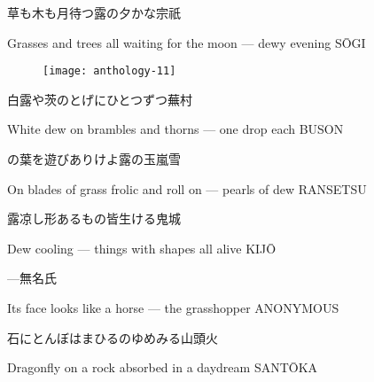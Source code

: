 \begin{haiku}
    {\FH 草も木も月待つ露の夕かな}\hfill{\FH 宗祇}

    \vin{} Grasses and trees all
    \vin{} \vin{} waiting for the moon ---
    \vin{} \vin{} \vin{} dewy evening \hspace{\fill} S\={O}GI
\end{haiku}

\begin{figure}
    \texttt{[image: anthology-11]}
\end{figure}

\begin{haiku}
    {\FH 白露や茨のとげにひとつずつ}\hfill{\FH 蕪村}

    \vin{} White dew
    \vin{} \vin{} on brambles and thorns ---
    \vin{} \vin{} \vin{} one drop each \hspace{\fill} BUSON
\end{haiku}

\begin{haiku}
    {\FH {}の葉を遊びありけよ露の玉}\hfill{\FH 嵐雪}

    \vin{} On blades of grass
    \vin{} \vin{} frolic and roll on ---
    \vin{} \vin{} \vin{} pearls of dew \hspace{\fill} RANSETSU
\end{haiku}

\begin{haiku}
    {\FH 露凉し形あるもの皆生ける}\hfill{\FH 鬼城}

    \vin{} Dew cooling ---
    \vin{} \vin{} things with shapes
    \vin{} \vin{} \vin{} all alive \hspace{\fill} KIJ\={O}
\end{haiku}

\begin{haiku}
    {---}\hfill{\FH 無名氏}

    \vin{} Its face
    \vin{} \vin{} looks like a horse ---
    \vin{} \vin{} \vin{} the grasshopper \hspace{\fill} ANONYMOUS
\end{haiku}

\begin{haiku}
    {\FH 石にとんぼはまひるのゆめみる}\hfill{\FH 山頭火}

    \vin{} Dragonfly on a rock
    \vin{} \vin{} absorbed in
    \vin{} \vin{} \vin{} a daydream \hspace{\fill} SANT\={O}KA
\end{haiku}

